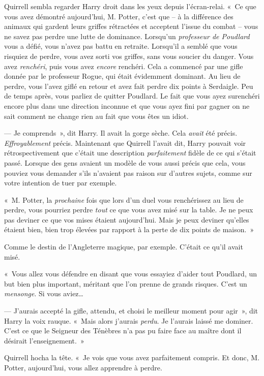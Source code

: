 Quirrell sembla regarder Harry droit dans les yeux depuis l'écran-relai.
«~Ce que vous avez démontré aujourd'hui, M. Potter, c'est que -- à la différence des animaux qui gardent leurs griffes rétractées et acceptent l'issue du combat -- vous ne savez pas perdre une lutte de dominance.
Lorsqu'un \emph{professeur de Poudlard} vous a défié, vous n'avez pas battu en retraite.
Lorsqu'il a semblé que vous risquiez de perdre, vous avez sorti vos griffes, sans vous soucier du danger.
Vous avez \emph{renchéri}, puis vous avez \emph{encore} renchéri.
Cela a commencé par une gifle donnée par le professeur Rogue, qui était évidemment dominant.
Au lieu de perdre, vous l'avez giflé en retour et avez fait perdre dix points à Serdaigle.
Peu de temps après, vous parliez de quitter Poudlard.
Le fait que vous ayez surenchéri encore plus dans une direction inconnue et que vous ayez fini par gagner on ne sait comment ne change rien au fait que vous êtes un idiot.

--- Je comprends~», dit Harry.
Il avait la gorge sèche.
Cela \emph{avait} été précis.
\emph{Effroyablement} précis.
Maintenant que Quirrell l'avait dit, Harry pouvait voir rétrospectivement que c'était une description \emph{parfaitement} fidèle de ce qui s'était passé.
Lorsque des gens avaient un modèle de vous aussi précis que cela, vous pouviez vous demander s'ils n'avaient pas raison sur d'autres sujets, comme sur votre intention de tuer par exemple.

«~M. Potter, la \emph{prochaine} fois que lors d'un duel vous renchérissez au lieu de perdre, vous pourriez perdre \emph{tout} ce que vous avez misé sur la table.
Je ne peux pas deviner ce que vos mises étaient aujourd'hui.
Mais je peux deviner qu'elles étaient bien, bien trop élevées par rapport à la perte de dix points de maison.~»

Comme le destin de l'Angleterre magique, par exemple.
C'était ce qu'il avait misé.

«~Vous allez vous défendre en disant que vous essayiez d'aider tout Poudlard, un but bien plus important, méritant que l'on prenne de grands risques.
C'est un \emph{mensonge}.
Si vous aviez…

--- J'aurais accepté la gifle, attendu, et choisi le meilleur moment pour agir~», dit Harry la voix rauque.
«~Mais alors j'aurais \emph{perdu}.
Je l'aurais laissé me dominer.
C'est ce que le Seigneur des Ténèbres n'a pas pu faire face au maître dont il désirait l'enseignement.~»

Quirrell hocha la tête.
«~Je vois que vous avez parfaitement compris.
Et donc, M. Potter, aujourd'hui, vous allez apprendre à perdre.


